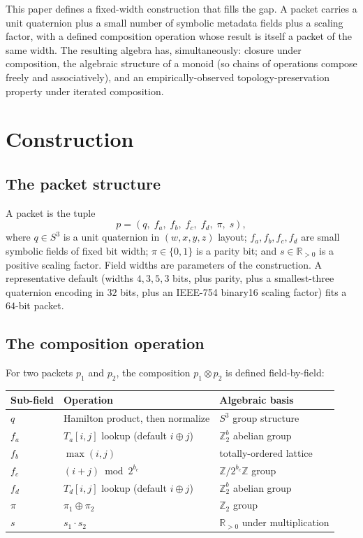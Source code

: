 \documentclass[11pt]{article}
\begin{document}
This paper defines a fixed-width construction that fills the gap. A packet
carries a unit quaternion plus a small number of symbolic metadata fields plus
a scaling factor, with a defined composition operation whose result is itself a
packet of the same width. The resulting algebra has, simultaneously: closure
under composition, the algebraic structure of a monoid (so chains of operations
compose freely and associatively), and an empirically-observed
topology-preservation property under iterated composition.

\section{Construction}

\subsection{The packet structure}

A packet is the tuple
\[
p = (q,\; f_a,\; f_b,\; f_c,\; f_d,\; \pi,\; s),
\]
where $q \in S^3$ is a unit quaternion in $(w,x,y,z)$ layout; $f_a, f_b, f_c,
f_d$ are small symbolic fields of fixed bit width; $\pi \in \{0,1\}$ is a parity
bit; and $s \in \mathbb{R}_{>0}$ is a positive scaling factor. Field widths are
parameters of the construction. A representative default (widths $4,3,5,3$ bits,
plus parity, plus a smallest-three quaternion encoding in $32$ bits, plus an
IEEE-754 binary16 scaling factor) fits a $64$-bit packet.

\subsection{The composition operation}

For two packets $p_1$ and $p_2$, the composition $p_1 \otimes p_2$ is defined
field-by-field:

\begin{center}
\begin{tabular}{lll}
\toprule
Sub-field & Operation & Algebraic basis \\
\midrule
$q$    & Hamilton product, then normalize & $S^3$ group structure \\
$f_a$  & $T_a[i,j]$ lookup (default $i \oplus j$) & $\mathbb{Z}_2^{b}$ abelian group \\
$f_b$  & $\max(i,j)$ & totally-ordered lattice \\
$f_c$  & $(i+j) \bmod 2^{b_c}$ & $\mathbb{Z}/2^{b_c}\mathbb{Z}$ group \\
$f_d$  & $T_d[i,j]$ lookup (default $i \oplus j$) & $\mathbb{Z}_2^{b}$ abelian group \\
$\pi$  & $\pi_1 \oplus \pi_2$ & $\mathbb{Z}_2$ group \\
$s$    & $s_1 \cdot s_2$ & $\mathbb{R}_{>0}$ under multiplication \\
\bottomrule
\end{tabular}
\end{center}
\end{document}
